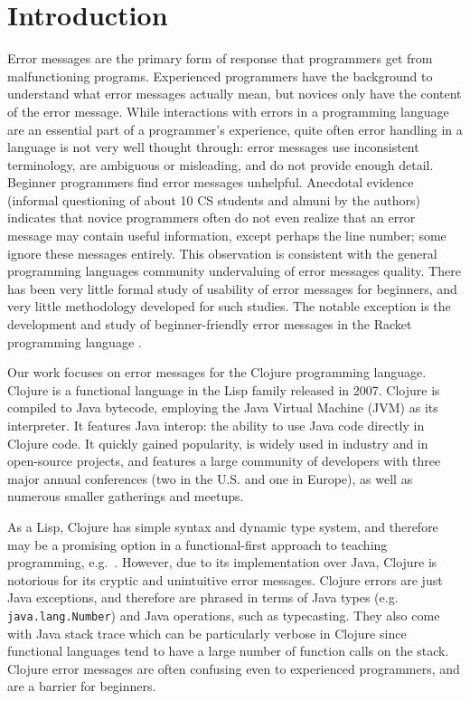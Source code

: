 \documentclass[12pt]{article}
\newcommand{\comment}[1]{{\bf \tt  {#1}}}
\newcommand{\emcomment}[1]{\textcolor{ForestGreen}{\comment{Elena: {#1}}}}
\begin{document}
\section{Introduction}\label{sec:intro}
Error messages are the primary form of response that programmers get from malfunctioning programs. 
Experienced programmers have the background to understand what error messages actually mean, but novices only have the content of the error message. 
While interactions with errors in a programming language are an essential part of a programmer's experience, quite often error handling in a language is not very well thought through: error messages use inconsistent terminology, are ambiguous or misleading, and do not provide enough detail. 
Beginner programmers find error messages unhelpful.
Anecdotal evidence (informal questioning of about 10 CS students and almuni by the authors) indicates that novice programmers often do not even realize that an error message may contain useful information, except perhaps the line number; some ignore these messages entirely. 
This observation is consistent with the general programming languages community undervaluing of error messages quality. There has been very little formal study of usability of error messages for beginners, and very little methodology developed for such studies. The notable exception is the development and study of beginner-friendly error messages in the Racket programming language \cite{Marceau:2011,Marceau:2011-2}. 

Our work focuses on error messages for the Clojure programming language. Clojure is a functional language in the Lisp family released in 2007. 
Clojure is compiled to Java bytecode, employing the Java Virtual Machine (JVM) as its interpreter. It features Java interop: the ability to use Java code directly in Clojure code. 
It quickly gained popularity, is widely used in industry and in open-source projects, and features a large community of developers with three major annual conferences (two in the U.S. and one in Europe), as well as numerous smaller gatherings and meetups. 

As a Lisp, Clojure has simple syntax and dynamic type system, and therefore may be a promising option in a functional-first approach to teaching programming, e.g.~\cite{thompson}. %
However, due to its implementation over Java, Clojure is notorious for its cryptic and unintuitive error messages. Clojure errors are just Java exceptions, and therefore are phrased in terms of Java types (e.g. \texttt{java.lang.Number}) and Java operations, such as typecasting. They also come with Java stack trace which can be particularly verbose in Clojure since functional languages tend to have a large number of function calls on the stack. Clojure error messages are often confusing even to experienced programmers, and are a barrier for beginners. 
\end{document}
